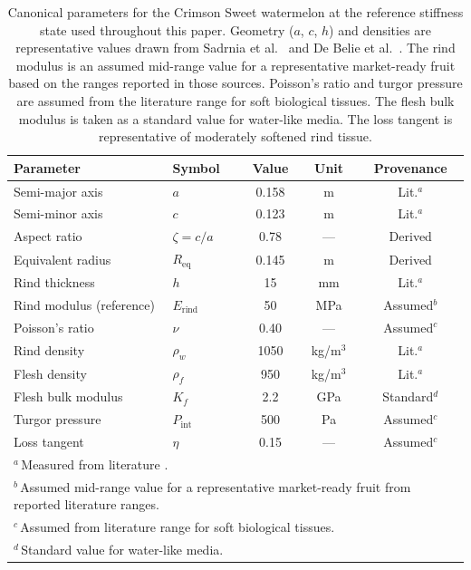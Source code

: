 \begin{table}[t]
  \centering
  \caption{Canonical parameters for the Crimson Sweet watermelon at the
    reference stiffness state used throughout this paper.  Geometry ($a$, $c$, $h$) and densities are
    representative values drawn from Sadrnia et
    al.~\cite{Sadrnia2008} and De Belie et al.~\cite{DeBelieetal2000}.
    The rind modulus is an assumed mid-range value for a representative
    market-ready fruit based
    on the ranges reported in those sources.  Poisson's ratio and turgor
    pressure are assumed from the literature range for soft biological
    tissues.  The flesh bulk modulus is taken as a standard value for
    water-like media.  The loss tangent is representative of moderately softened
    rind tissue.}
  \label{tab:canonical}
  \begin{tabular}{llccc}
    \toprule
    Parameter & Symbol & Value & Unit & Provenance \\
    \midrule
    Semi-major axis    & $a$                 & 0.158 & m & Lit.$^a$ \\
    Semi-minor axis    & $c$                 & 0.123 & m & Lit.$^a$ \\
    Aspect ratio       & $\zeta = c/a$       & 0.78  & --- & Derived \\
    Equivalent radius  & $R_{\mathrm{eq}}$   & 0.145 & m & Derived \\
    Rind thickness     & $h$                 & 15    & mm & Lit.$^a$ \\
    Rind modulus (reference) & $E_{\mathrm{rind}}$ & 50   & MPa & Assumed$^b$ \\
    Poisson's ratio    & $\nu$               & 0.40  & --- & Assumed$^c$ \\
    Rind density       & $\rho_w$            & 1050  & kg/m$^3$ & Lit.$^a$ \\
    Flesh density      & $\rho_f$            & 950   & kg/m$^3$ & Lit.$^a$ \\
    Flesh bulk modulus  & $K_f$              & 2.2   & GPa & Standard$^d$ \\
    Turgor pressure     & $P_{\mathrm{int}}$ & 500   & Pa & Assumed$^c$ \\
    Loss tangent        & $\eta$             & 0.15  & --- & Assumed$^c$ \\
    \bottomrule
    \multicolumn{5}{l}{\footnotesize $^a$\,Measured from literature
      \cite{Sadrnia2008, DeBelieetal2000}.} \\
    \multicolumn{5}{l}{\footnotesize $^b$\,Assumed mid-range value
      for a representative market-ready fruit from reported literature ranges.} \\
    \multicolumn{5}{l}{\footnotesize $^c$\,Assumed from literature
      range for soft biological tissues.} \\
    \multicolumn{5}{l}{\footnotesize $^d$\,Standard value for
      water-like media.}
  \end{tabular}
\end{table}

